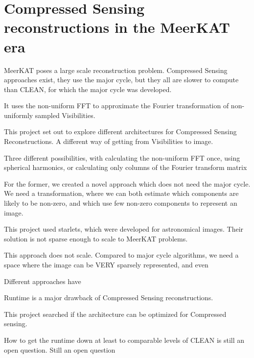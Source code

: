 \section{Compressed Sensing reconstructions in the MeerKAT era}
MeerKAT poses a large scale reconstruction problem. Compressed Sensing approaches exist, they use the major cycle, but they all are slower to compute than CLEAN, for which the major cycle was developed. 

It uses the non-uniform FFT to approximate the Fourier transformation of non-uniformly sampled Visibilities.

This project set out to explore different architectures for Compressed Sensing Reconstructions. A different way of getting from Visibilities to image. 

Three different possibilities, with calculating the non-uniform FFT once, using spherical harmonics, or calculating only columns of the Fourier transform matrix

For the former, we created a novel approach which does not need the major cycle. We need a transformation, where we can both estimate which components are likely to be non-zero, and which use few non-zero components to represent an image.

This project used starlets, which were developed for astronomical images. Their solution is not sparse enough to scale to MeerKAT problems.

This approach does not scale. Compared to major cycle algorithms, we need a space where the image can be VERY sparsely represented, and even 

Different approaches have


Runtime is a major drawback of Compressed Sensing reconstructions.

This project searched if the architecture can be optimized for Compressed sensing.

 How to get the runtime down at least to comparable levels of CLEAN is still an open question.
Still an open question









